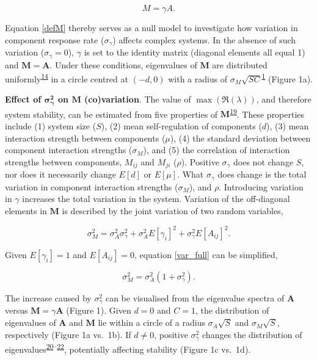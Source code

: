 \documentclass[]{article}
\begin{document}
\begin{equation} \label{defM}
M = \gamma A.
\end{equation}

Equation \ref{defM} thereby serves as a null model to investigate how
variation in component response rate (\(\sigma_{\gamma}\)) affects
complex systems. In the absence of such variation
(\(\sigma_{\gamma} = 0\)), \(\gamma\) is set to the identity matrix
(diagonal elements all equal 1) and \(\mathbf{M} = \mathbf{A}\). Under
these conditions, eigenvalues of \(\mathbf{M}\) are distributed
uniformly\textsuperscript{\protect\hyperlink{ref-Tao2010}{14}} in a
circle centred at \((-d, 0)\) with a radius of
\(\sigma_{M} \sqrt{SC}\)\textsuperscript{\protect\hyperlink{ref-May1972}{1}}
(Figure 1a).

\textbf{Effect of \(\mathbf{\sigma^{2}_{\gamma}}\) on \(\mathbf{M}\)
(co)variation}. The value of \(\max(\Re(\lambda))\), and therefore
system stability, can be estimated from five properties of
\(\mathbf{M}\)\textsuperscript{\protect\hyperlink{ref-Tang2014b}{19}}.
These properties include (1) system size (\(S\)), (2) mean
self-regulation of components (\(d\)), (3) mean interaction strength
between components (\(\mu\)), (4) the standard deviation between
component interaction strengths (\(\sigma_{M}\)), and (5) the
correlation of interaction strengths between components, \(M_{ij}\) and
\(M_{ji}\) (\(\rho\)). Positive \(\sigma_{\gamma}\) does not change
\(S\), nor does it necessarily change \(E[d]\) or \(E[\mu]\). What
\(\sigma_{\gamma}\) does change is the total variation in component
interaction strengths (\(\sigma_{M}\)), and \(\rho\). Introducing
variation in \(\gamma\) increases the total variation in the system.
Variation of the off-diagonal elements in \(\mathbf{M}\) is described by
the joint variation of two random variables,

\begin{equation} \label{var_full}
\sigma^{2}_{M} = \sigma^{2}_{A}\sigma^{2}_{\gamma} + \sigma^{2}_{A}E[\gamma_{i}]^{2}+\sigma^{2}_{\gamma}E[A_{ij}]^{2}.
\end{equation}

Given \(E[\gamma_{i}] = 1\) and \(E[A_{ij}] = 0\), equation
\ref{var_full} can be simplified,

\begin{equation} \label{var_reduced}
\sigma^{2}_{M} = \sigma^{2}_{A}(1 + \sigma^{2}_{\gamma}).
\end{equation}

The increase caused by \(\sigma^{2}_\gamma\) can be visualised from the
eigenvalue spectra of \(\textbf{A}\) versus
\(\textbf{M} = \gamma\textbf{A}\) (Figure 1). Given \(d = 0\) and
\(C = 1\), the distribution of eigenvalues of \(\textbf{A}\) and
\(\textbf{M}\) lie within a circle of a radius \(\sigma_{A}\sqrt{S}\)
and \(\sigma_{M}\sqrt{S}\), respectively (Figure 1a vs.~1b). If
\(d \neq 0\), positive \(\sigma^{2}_\gamma\) changes the distribution of
eigenvalues\textsuperscript{\protect\hyperlink{ref-Ahmadian2015}{20}--\protect\hyperlink{ref-Stone2017}{22}},
potentially affecting stability (Figure 1c vs.~1d).
\end{document}
